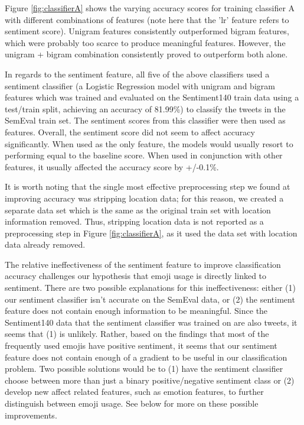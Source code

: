 \documentclass[10pt]{article}
\begin{document}
Figure \ref{fig:classifierA} shows the varying accuracy scores for training classifier A with different combinations of features (note here that the 'lr' feature refers to sentiment score). Unigram features consistently outperformed bigram features, which were probably too scarce to produce meaningful features. However, the unigram + bigram combination consistently proved to outperform both alone.

In regards to the sentiment feature, all five of the above classifiers used a sentiment classifier (a Logistic Regression model with unigram and bigram features which was trained and evaluated on the Sentiment140 train data using a test/train split, achieving an accuracy of 81.99\%) to classify the tweets in the SemEval train set. The sentiment scores from this classifier were then used as features. Overall, the sentiment score did not seem to affect accuracy significantly. When used as the only feature, the models would usually resort to performing equal to the baseline score. When used in conjunction with other features, it usually affected the accuracy score by +/-0.1\%.

It is worth noting that the single most effective preprocessing step we found at improving accuracy was stripping location data; for this reason, we created a separate data set which is the same as the original train set with location information removed. Thus, stripping location data is not reported as a preprocessing step in Figure \ref{fig:classifierA}, as it used the data set with location data already removed.


The relative ineffectiveness of the sentiment feature to improve classification accuracy challenges our hypothesis that emoji usage is directly linked to sentiment. There are two possible explanations for this ineffectiveness: either (1) our sentiment classifier isn't accurate on the SemEval data, or (2) the sentiment feature does not contain enough information to be meaningful. Since the Sentiment140 data that the sentiment classifier was trained on are also tweets, it seems that (1) is unlikely. Rather, based on the findings that most of the frequently used emojis have positive sentiment\cite{novak2015sentiment}, it seems that our sentiment feature does not contain enough of a gradient to be useful in our classification problem. Two possible solutions would be to (1) have the sentiment classifier choose between more than just a binary positive/negative sentiment class or (2) develop new affect related features, such as emotion features, to further distinguish between emoji usage. See below for more on these possible improvements.
\end{document}
